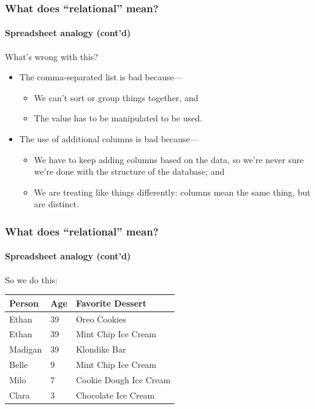 \documentclass[aspectratio=169]{beamer}
\begin{document}
\begin{frame}
  \frametitle{What does ``relational'' mean?}
  \framesubtitle{Spreadsheet analogy (cont'd)}

  What's wrong with this?
  \begin{itemize}
    \item The comma-separated list is bad because---
          \begin{itemize}
            \item We can't sort or group things together, and
            \item The value has to be manipulated to be used.
          \end{itemize}
    \item The use of additional columns is bad because---
          \begin{itemize}
            \item We have to keep adding columns based on the data, so we're
                  never sure we're done with the structure of the database; and
            \item We are treating like things differently: columns mean the same
                  thing, but are distinct.
          \end{itemize}
  \end{itemize}
\end{frame}

\begin{frame}
  \frametitle{What does ``relational'' mean?}
  \framesubtitle{Spreadsheet analogy (cont'd)}

  So we do this:

  \begin{table}[]
    \small
    \begin{tabular}{@{}lll@{}}
      \toprule
      Person  & Age & Favorite Dessert       \\ \midrule
      Ethan   & 39  & Oreo Cookies           \\
      Ethan   & 39  & Mint Chip Ice Cream    \\
      Madigan & 39  & Klondike Bar           \\
      Belle   & 9   & Mint Chip Ice Cream    \\
      Milo    & 7   & Cookie Dough Ice Cream \\
      Clara   & 3   & Chocolate Ice Cream    \\ \bottomrule
    \end{tabular}
  \end{table}
\end{frame}
\end{document}

